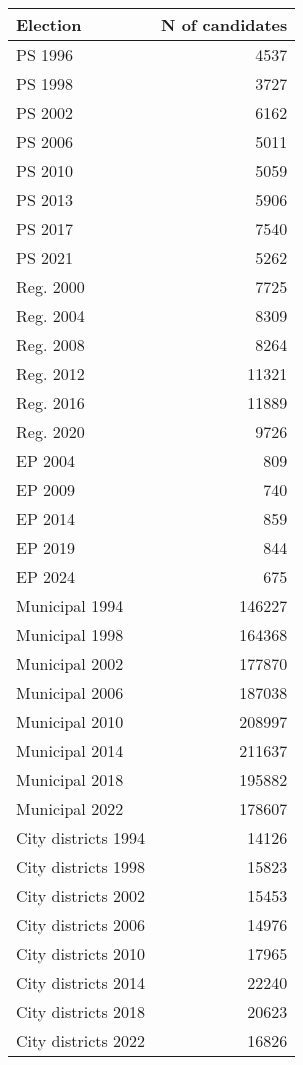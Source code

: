 
\begin{tabular}{l|r}
\hline
Election & N of candidates\\
\hline
PS 1996 & 4537\\
PS 1998 & 3727\\
PS 2002 & 6162\\
PS 2006 & 5011\\
PS 2010 & 5059\\
PS 2013 & 5906\\
PS 2017 & 7540\\
PS 2021 & 5262\\
\hline
Reg. 2000 & 7725\\
Reg. 2004 & 8309\\
Reg. 2008 & 8264\\
Reg. 2012 & 11321\\
Reg. 2016 & 11889\\
Reg. 2020 & 9726\\
\hline
EP 2004 & 809\\
EP 2009 & 740\\
EP 2014 & 859\\
EP 2019 & 844\\
EP 2024 & 675\\
\hline
Municipal 1994 & 146227\\
Municipal 1998 & 164368\\
Municipal 2002 & 177870\\
Municipal 2006 & 187038\\
Municipal 2010 & 208997\\
Municipal 2014 & 211637\\
Municipal 2018 & 195882\\
Municipal 2022 & 178607\\
\hline
City districts 1994 & 14126\\
City districts 1998 & 15823\\
City districts 2002 & 15453\\
City districts 2006 & 14976\\
City districts 2010 & 17965\\
City districts 2014 & 22240\\
City districts 2018 & 20623\\
City districts 2022 & 16826\\
\hline
\end{tabular}

